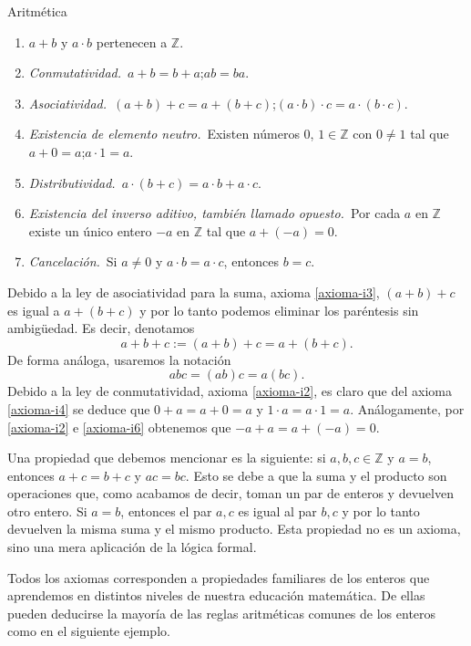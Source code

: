 \begin{section}{Aritmética}
\begin{enumerate}[label=\textbf{I\arabic*)}, ref=\textbf{I\arabic*}]
\item \label{axioma-i1} $a+b$ y $a\cdot b$ pertenecen a ${\mathbb Z}$.
\item \label{axioma-i2} \textit{Conmutatividad.}\, $a+b = b+a$;\qquad $ab=ba$. 
\item \label{axioma-i3} \textit{Asociatividad.}\, $(a+b)+c = a+(b+c)$;\qquad $(a\cdot b)\cdot c = a\cdot (b\cdot c)$. 
\item \label{axioma-i4} \textit{Existencia de elemento neutro.}\, Existen números $0$, $1 \in \mathbb Z$ con $0\not=1$ tal que $a+0=a$;\qquad $a\cdot 1=a$. 
\item \label{axioma-i5} \textit{Distributividad.}\, $a\cdot (b+c)=a\cdot b+a\cdot c$. 
\item \label{axioma-i6} \textit{Existencia del inverso aditivo, también llamado opuesto.}\, Por cada $a$ en ${\mathbb Z}$ existe un único entero $-a$ en ${\mathbb Z}$ tal que $a+(-a)=0$. 
\item \label{axioma-i7} \textit{Cancelación.}\, Si $a \ne 0$ y $a\cdot b=a\cdot c$, entonces $b=c$. 
\end{enumerate}


Debido a la ley de asociatividad para la suma, axioma \ref{axioma-i3}, $(a+b)+c$ es igual a $a+(b+c)$ y por lo tanto podemos eliminar los paréntesis sin ambigüedad. Es decir, denotamos
$$
a+b+c := (a+b)+c = a+(b+c).
$$
De forma análoga, usaremos la notación
$$
abc = (ab)c = a(bc).
$$
Debido a la ley de conmutatividad, axioma \ref{axioma-i2}, es claro que  del axioma \ref{axioma-i4} se deduce que  $0+a=a+0=a$ y $1\cdot a = a\cdot 1=a$. Análogamente,  por  \ref{axioma-i2} e  \ref{axioma-i6} obtenemos que  $-a+a =    a+(-a)=0$.

Una propiedad que debemos mencionar es la siguiente: si $a,b, c \in \mathbb Z$  y $a=b$, entonces $a+c = b+c$ y $ac = bc$. Esto se debe a que la suma y el producto son operaciones que, como acabamos de decir, toman un par de enteros y  devuelven otro entero. Si $a=b$, entonces el  par $a,c$ es igual al par $b,c$ y por lo tanto devuelven la misma suma y el mismo producto. Esta propiedad no es un axioma, sino  una mera aplicación de la lógica formal. 
  
Todos los axiomas corresponden a propiedades familiares de los  enteros que aprendemos en distintos niveles de nuestra educación  matemática. De ellas pueden deducirse la mayoría de las reglas  aritméticas comunes de los enteros como en el siguiente ejemplo.


\end{section}
